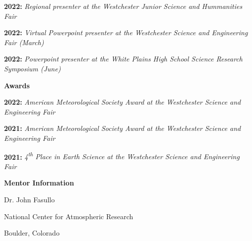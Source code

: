 \documentclass[11pt]{article}
\begin{document}
\textbf{2022:} \emph{Regional presenter at the Westchester Junior Science and Hummanities Fair}

\textbf{2022:} \emph{Virtual Powerpoint presenter at the Westchester Science and Engineering Fair (March)}

\textbf{2022:} \emph{Powerpoint presenter at the White Plains High School Science Research Symposium (June)}

\begin{center}
\textbf{Awards}
\end{center}

\textbf{2022:} \emph{American Meteorological Society Award at the Westchester Science and Engineering Fair}

\textbf{2021:} \emph{American Meteorological Society Award at the Westchester Science and Engineering Fair}

\textbf{2021:} \emph{4\textsuperscript{th} Place in Earth Science at the Westchester Science and Engineering Fair}

\begin{center}
\textbf{Mentor Information}

Dr. John Fasullo

National Center for Atmospheric Research

Boulder, Colorado
\end{center}
\end{document}
